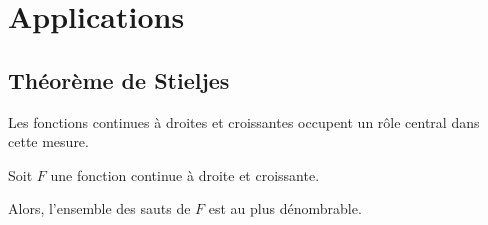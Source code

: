 %
%
%
%
%
%
%
%
%
%
%

\section{Applications}

\subsection{Théorème de Stieljes}

Les fonctions continues à droites et croissantes occupent un rôle central dans cette mesure.

\begin{prop}
Soit $F$ une fonction continue à droite et croissante.

Alors, l'ensemble des sauts de $F$ est au plus dénombrable.
\end{prop}

